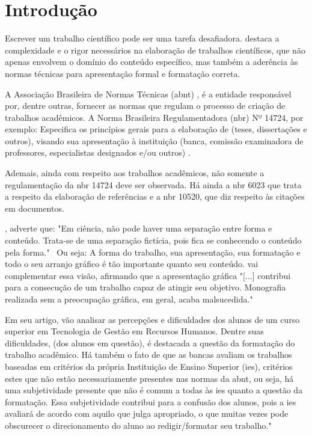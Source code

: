 \chapter{Introdução}

Escrever um trabalho científico pode ser uma tarefa desafiadora. \cite{severino}
destaca a complexidade e o rigor necessários na elaboração de trabalhos científicos, que não
apenas envolvem o domínio do conteúdo específico, mas também a aderência às normas
técnicas para apresentação formal e formatação correta.

A Associação Brasileira de Normas Técnicas 
(\acrshort{abnt})
, é a entidade responsável por,
dentre outras, fornecer as normas que regulam o processo de criação de trabalhos acadêmicos.
A Norma Brasileira Regulamentadora 
(\acrshort{nbr})
 Nº 14724, por exemplo: Especifica os princípios
gerais para a elaboração de (teses, dissertações e outros), visando sua apresentação à
instituição (banca, comissão examinadora de professores, especialistas designados e/ou
outros)
\cite{abnt}.

Ademais, ainda com respeito aos trabalhos acadêmicos, não somente a
regulamentação da 
\acrshort{nbr}
14724 deve ser observada. Há ainda a 
\acrshort{nbr}
6023 que trata a respeito
da elaboração de referências e a 
\acrshort{nbr}
10520, que diz respeito às citações em documentos.

\cite{castro}, adverte que: "Em ciência, não pode haver uma
separação entre forma e conteúdo. Trata-se de uma separação fictícia, pois fica se conhecendo
o conteúdo pela forma."~ Ou seja: A forma do trabalho, sua apresentação, sua formatação e
todo o seu arranjo gráfico é tão importante quanto seu conteúdo. 
\cite{medeiros} vai
complementar essa visão, afirmando que a apresentação gráfica "{[}...{]} contribui para a
consecução de um trabalho capaz de atingir seu objetivo. Monografia realizada sem a
preocupação gráfica, em geral, acaba malsucedida."~

Em seu artigo, 
\cite{SilvaVitoria}
vão analisar as percepções e dificuldades dos
alunos de um curso superior em Tecnologia de Gestão em Recursos Humanos. Dentre suas
dificuldades, (dos alunos em questão), é destacada a questão da formatação do trabalho
acadêmico. Há também o fato de que as bancas avaliam os trabalhos baseadas em critérios da
própria Instituição de Ensino Superior
(\acrshort{ies}),
critérios estes que não estão necessariamente
presentes nas normas da \acrshort{abnt}, ou seja, há uma subjetividade presente que não é comum a
todas às \acrshort{ies} quanto a questão da formatação. Essa subjetividade contribui para a confusão dos
alunos, pois a \acrshort{ies} avaliará de acordo com aquilo que julga apropriado, o que muitas vezes
pode obscurecer o direcionamento do aluno ao redigir/formatar seu trabalho."~

